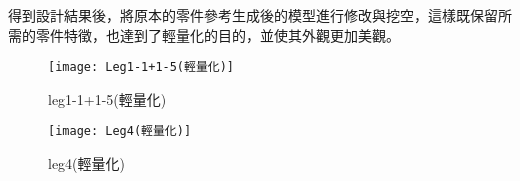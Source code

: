 得到設計結果後，將原本的零件參考生成後的模型進行修改與挖空，這樣既保留所需的零件特徵，也達到了輕量化的目的，並使其外觀更加美觀。\

\begin{figure}[htbp]
  \begin{minipage}[t]{1.2\linewidth}
    \centering
    \texttt{[image: Leg1-1+1-5(輕量化)]}
    \caption{leg1-1+1-5(輕量化)}
    \label{Leg1-1+1-5(輕量化)}
  \end{minipage}
  \hfill
  \begin{minipage}[t]{1.2\linewidth}
    \centering
    \texttt{[image: Leg4(輕量化)]}
    \caption{leg4(輕量化)}
    \label{Leg4(輕量化)}
  \end{minipage}
\end{figure}

